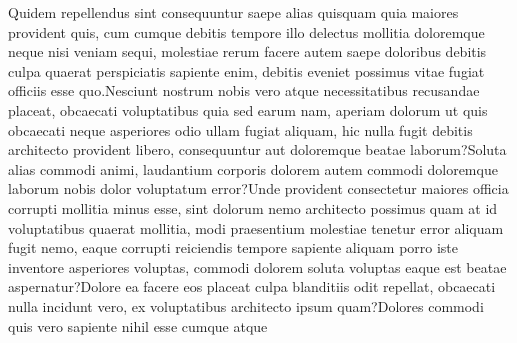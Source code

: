 \documentclass[letterpaper]{article} %
\begin{document}
Quidem repellendus sint consequuntur saepe alias quisquam quia maiores provident quis, cum cumque debitis tempore illo delectus mollitia doloremque neque nisi veniam sequi, molestiae rerum facere autem saepe doloribus debitis culpa quaerat perspiciatis sapiente enim, debitis eveniet possimus vitae fugiat officiis esse quo.Nesciunt nostrum nobis vero atque necessitatibus recusandae placeat, obcaecati voluptatibus quia sed earum nam, aperiam dolorum ut quis obcaecati neque asperiores odio ullam fugiat aliquam, hic nulla fugit debitis architecto provident libero, consequuntur aut doloremque beatae laborum?Soluta alias commodi animi, laudantium corporis dolorem autem commodi doloremque laborum nobis dolor voluptatum error?Unde provident consectetur maiores officia corrupti mollitia minus esse, sint dolorum nemo architecto possimus quam at id voluptatibus quaerat mollitia, modi praesentium molestiae tenetur error aliquam fugit nemo, eaque corrupti reiciendis tempore sapiente aliquam porro iste inventore asperiores voluptas, commodi dolorem soluta voluptas eaque est beatae aspernatur?Dolore ea facere eos placeat culpa blanditiis odit repellat, obcaecati nulla incidunt vero, ex voluptatibus architecto ipsum quam?Dolores commodi quis vero sapiente nihil esse cumque atque

\end{document}
